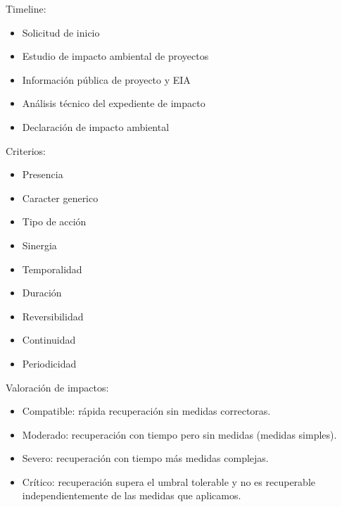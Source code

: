 \begin{mydef}
	Timeline:
	\begin{itemize}
		\item Solicitud de inicio
		\item Estudio de impacto ambiental de proyectos
		\item Información pública de proyecto y EIA
		\item Análisis técnico del expediente de impacto
		\item Declaración de impacto ambiental
	\end{itemize}
	Criterios:
	\begin{itemize}
		\item Presencia
		\item Caracter generico
		\item Tipo de acción 
		\item Sinergia
		\item Temporalidad
		\item Duración 
		\item Reversibilidad
		\item Continuidad
		\item Periodicidad
	\end{itemize}
	Valoración de impactos:
	\begin{itemize}
		\item Compatible: rápida recuperación sin medidas correctoras.
		\item Moderado: recuperación con tiempo pero sin medidas (medidas simples).
		\item Severo: recuperación con tiempo más medidas complejas.
		\item Crítico: recuperación supera el umbral tolerable y no es recuperable independientemente de las medidas que aplicamos.
	\end{itemize}
\end{mydef}

